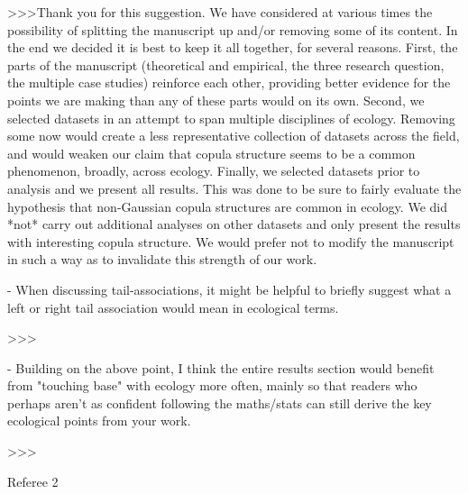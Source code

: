 >>>Thank you for this suggestion. We have considered at various times the possibility
of splitting the manuscript up
and/or removing some of its content. In the end we decided it is best to keep it all together,
for several reasons. First, the parts of the manuscript (theoretical and empirical, the three
research question, the multiple case studies) reinforce each other, providing better evidence
for the points we are making than any of these parts would on its own. Second,
we selected datasets in an attempt to span multiple disciplines of ecology.
Removing some now would create a less representative collection of datasets across the field, and would weaken
our claim that copula structure seems to be a common phenomenon, broadly, across ecology.
Finally, we selected datasets prior to analysis and we present all results. This was done
to be sure to fairly evaluate the hypothesis that non-Gaussian copula structures are
common in ecology. We did *not* carry out additional analyses on other datasets and
only present the results with interesting copula structure. We would prefer not to
modify the manuscript in such a way as to invalidate this strength of our work.

- When discussing tail-associations, it might be helpful to briefly suggest what a left or right tail association would mean in ecological terms.

>>>

- Building on the above point, I think the entire results section would benefit from "touching base" with ecology more often, mainly so that readers who perhaps aren't as confident following the maths/stats can still derive the key ecological points from your work.

>>>


Referee 2

